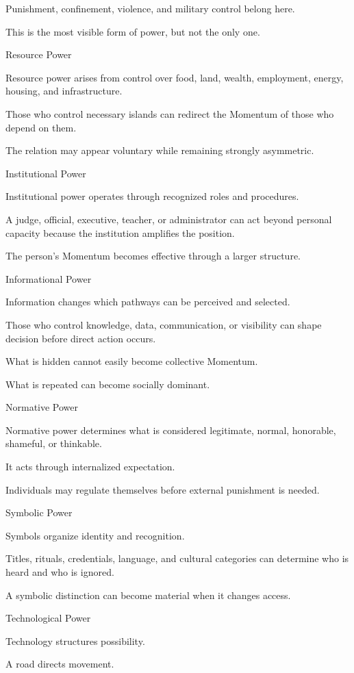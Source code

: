 Punishment, confinement, violence, and military control belong here.

This is the most visible form of power, but not the only one.

Resource Power

Resource power arises from control over food, land, wealth, employment, energy, housing, and infrastructure.

Those who control necessary islands can redirect the Momentum of those who depend on them.

The relation may appear voluntary while remaining strongly asymmetric.

Institutional Power

Institutional power operates through recognized roles and procedures.

A judge, official, executive, teacher, or administrator can act beyond personal capacity because the institution amplifies the position.

The person’s Momentum becomes effective through a larger structure.

Informational Power

Information changes which pathways can be perceived and selected.

Those who control knowledge, data, communication, or visibility can shape decision before direct action occurs.

What is hidden cannot easily become collective Momentum.

What is repeated can become socially dominant.

Normative Power

Normative power determines what is considered legitimate, normal, honorable, shameful, or thinkable.

It acts through internalized expectation.

Individuals may regulate themselves before external punishment is needed.

Symbolic Power

Symbols organize identity and recognition.

Titles, rituals, credentials, language, and cultural categories can determine who is heard and who is ignored.

A symbolic distinction can become material when it changes access.

Technological Power

Technology structures possibility.

A road directs movement.

